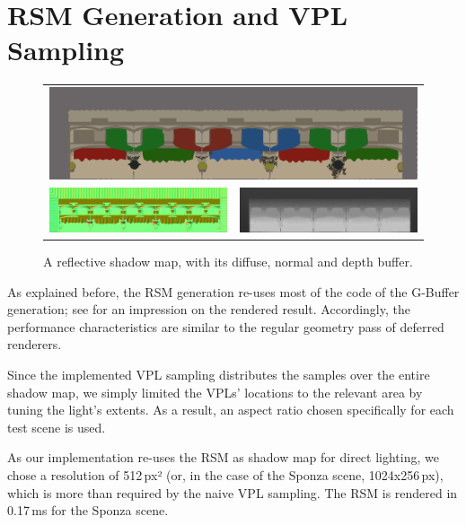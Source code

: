 \pagebreak

\section{RSM Generation and VPL Sampling}
\label{sec:results:RsmAndVplSampling}

\begin{figure}[htb]
\centering
  \begin{tabular}{@{}cc@{}}
    \multicolumn{2}{c}{\includegraphics[width=1.0\textwidth]{screenshots/RSM_diffuse}} \\
    \includegraphics[width=.48\textwidth]{screenshots/RSM_normal} &
    \includegraphics[width=.48\textwidth]{screenshots/RSM_depth}
  \end{tabular}
  \caption{A reflective shadow map, with its diffuse, normal and depth buffer.}
  \label{fig:results:RSMBuffers}
\end{figure}


As explained before, the RSM generation re-uses most of the code of the G-Buffer generation; see  for an impression on the rendered result. Accordingly, the performance characteristics are similar to the regular geometry pass of deferred renderers.

Since the implemented VPL sampling distributes the samples over the entire shadow map, we simply limited the VPLs' locations to the relevant area by tuning the light's extents. As a result, an aspect ratio chosen specifically for each test scene is used.

As our implementation re-uses the RSM as shadow map for direct lighting, we chose a resolution of 512\,px² (or, in the case of the Sponza scene, 1024x256\,px), which is more than required by the naive VPL sampling. The RSM is rendered in 0.17\,ms for the Sponza scene.

